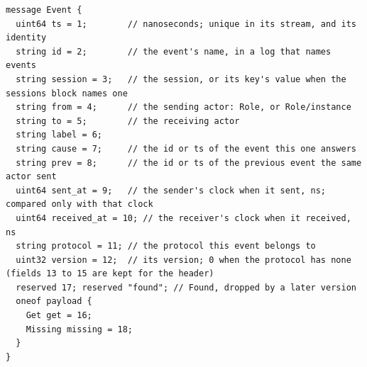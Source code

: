 \begin{lstlisting}[language={},basicstyle=\ttfamily\scriptsize,breaklines=true]
message Event {
  uint64 ts = 1;        // nanoseconds; unique in its stream, and its identity
  string id = 2;        // the event's name, in a log that names events
  string session = 3;   // the session, or its key's value when the sessions block names one
  string from = 4;      // the sending actor: Role, or Role/instance
  string to = 5;        // the receiving actor
  string label = 6;
  string cause = 7;     // the id or ts of the event this one answers
  string prev = 8;      // the id or ts of the previous event the same actor sent
  uint64 sent_at = 9;   // the sender's clock when it sent, ns; compared only with that clock
  uint64 received_at = 10; // the receiver's clock when it received, ns
  string protocol = 11; // the protocol this event belongs to
  uint32 version = 12;  // its version; 0 when the protocol has none (fields 13 to 15 are kept for the header)
  reserved 17; reserved "found"; // Found, dropped by a later version
  oneof payload {
    Get get = 16;
    Missing missing = 18;
  }
}
\end{lstlisting}

